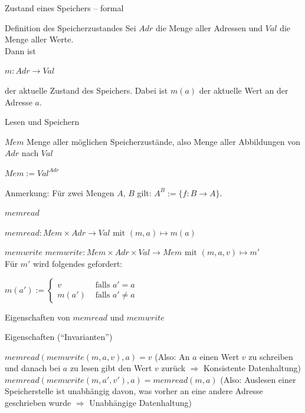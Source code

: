 \begin{frame}{Zustand eines Speichers -- formal}
	\p\begin{block}{Definition des Speicherzustandes}
		Sei $Adr$ die Menge aller Adressen und $Val$ die Menge aller Werte.\\
		Dann ist \\ \begin{center}
			$m: Adr \rightarrow Val$
		\end{center}
		der aktuelle Zustand des Speichers. Dabei ist $m(a)$ der aktuelle Wert an der Adresse $a$.
	\end{block}
\end{frame}


\begin{frame}{Lesen und Speichern}
	\pause
	\begin{block}{$Mem$}
		Menge aller möglichen Speicherzustände, also Menge aller Abbildungen von $Adr$ nach $Val$
		\begin{center}
			$Mem:= Val^{Adr}$
		\end{center}
	\end{block}
	\p Anmerkung: \p Für zwei Mengen $A$, $B$ gilt\p : $A^B := \{f: B \rightarrow A\}$.\p
	\begin{block}{$memread$}
		\begin{center}
			$memread: Mem \times Adr \rightarrow Val \text{ mit } (m, a) \mapsto m(a)$
		\end{center}
	\end{block}
	\pause
	\begin{block}{$memwrite$}
		$memwrite: Mem \times Adr \times Val \rightarrow Mem \text{ mit } (m, a,v) \mapsto m'$\\
		Für $m'$ wird folgendes gefordert:
		\begin{center}
			$m(a') :=\begin{cases} 
			v& \text{ falls } a' = a\\
			m(a') &\text{ falls } a' \neq a
			\end{cases} $ 
		\end{center}
	\end{block}
\end{frame}

\begin{frame}{Eigenschaften von $memread$ und $memwrite$}
	
	\begin{block}{Eigenschaften (``Invarianten'')}
		\begin{itemize}
			\pitem $memread(memwrite(m,a,v),a) = v$ \p (Also: An $a$ einen Wert $v$ zu schreiben und danach bei $a$ zu lesen gibt den Wert $v$ zurück \p $\Rightarrow$ Konsistente Datenhaltung)
			\pitem $memread(memwrite(m, a', v'),a) = memread(m,a)$ \p (Also: Auslesen einer Speicherstelle ist unabhängig davon, was vorher an eine andere Adresse geschrieben wurde \p $\Rightarrow$ Unabhängige Datenhaltung)
		\end{itemize}
	\end{block}

\end{frame}

